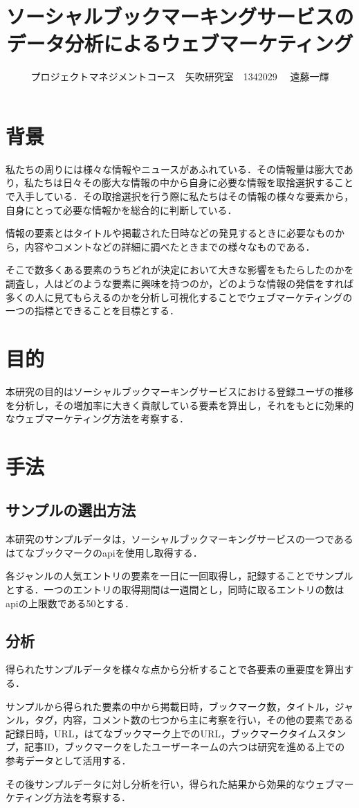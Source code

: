 \documentclass[uplatex,twocolumn,dvipdfmx]{jsarticle}
\title{\vspace{-5mm}\fontsize{14pt}{0pt}\selectfont ソーシャルブックマーキングサービスのデータ分析によるウェブマーケティング}
\author{\normalsize プロジェクトマネジメントコース　矢吹研究室　1342029 　遠藤一輝}
\date{}
\begin{document}
\fontsize{10.5pt}{\baselineskip}\selectfont
\maketitle





\section{背景}

私たちの周りには様々な情報やニュースがあふれている．その情報量は膨大であり，私たちは日々その膨大な情報の中から自身に必要な情報を取捨選択することで入手している．その取捨選択を行う際に私たちはその情報の様々な要素から，自身にとって必要な情報かを総合的に判断している\cite{yahoo}．\par
情報の要素とはタイトルや掲載された日時などの発見するときに必要なものから，内容やコメントなどの詳細に調べたときまでの様々なものである．\par
そこで数多くある要素のうちどれが決定において大きな影響をもたらしたのかを調査し，人はどのような要素に興味を持つのか，どのような情報の発信をすれば多くの人に見てもらえるのかを分析し可視化することでウェブマーケティングの一つの指標とできることを目標とする．

\section{目的}

本研究の目的はソーシャルブックマーキングサービスにおける登録ユーザの推移を分析し，その増加率に大きく貢献している要素を算出し，それをもとに効果的なウェブマーケティング方法を考察する．　　　　　　　　　　　　　　　　　　　　　　　　　　　　　　　　　　　　　　　　　　　

\section{手法}
\subsection{サンプルの選出方法}
本研究のサンプルデータは，ソーシャルブックマーキングサービスの一つであるはてなブックマークのapi\cite{hatena}を使用し取得する．\par
各ジャンルの人気エントリの要素を一日に一回取得し，記録することでサンプルとする．一つのエントリの取得期間は一週間とし，同時に取るエントリの数はapiの上限数である50とする．
\subsection{分析}
得られたサンプルデータを様々な点から分析することで各要素の重要度を算出する．\par
サンプルから得られた要素の中から掲載日時，ブックマーク数，タイトル，ジャンル，タグ，内容，コメント数の七つから主に考察を行い，その他の要素である記録日時，URL，はてなブックマーク上でのURL，ブックマークタイムスタンプ，記事ID，ブックマークをしたユーザーネームの六つは研究を進める上での参考データとして活用する．\par
その後サンプルデータに対し分析を行い，得られた結果から効果的なウェブマーケティング方法を考察する．
\end{document}

